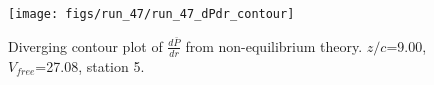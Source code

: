 \begin{figure}[H]
\centering
\texttt{[image: figs/run\_47/run\_47\_dPdr\_contour]}
\caption{Diverging contour plot of $\frac{d\bar{P}}{dr}$ from non-equilibrium theory. $z/c$=9.00, $V_{free}$=27.08, station 5.}
\label{fig:run_47_dPdr_contour}
\end{figure}


